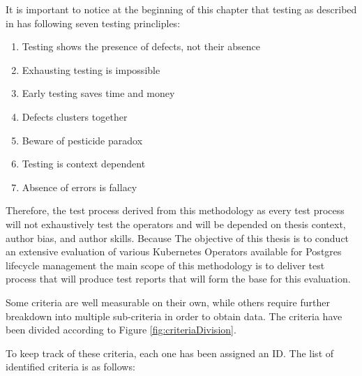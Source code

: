 It is important to notice at the beginning of this chapter that testing as described in \cite{FoundationOfSoftwareTesting} has following seven testing princliples:
\begin{enumerate}
    \item Testing shows the presence of defects, not their absence
    \item Exhausting testing is impossible
    \item Early testing saves time and money
    \item Defects clusters together
    \item Beware of pesticide paradox
    \item Testing is context dependent
    \item Absence of errors is fallacy
\end{enumerate}



Therefore, the test process derived from this methodology as every test process will not exhaustively test the operators and will be depended on thesis context, author bias, and author skills. Because The objective of this thesis is to conduct an extensive evaluation of various Kubernetes
Operators available for Postgres lifecycle management the main scope of this methodology is to deliver test process that will produce test reports that will form the base for this evaluation.

Some criteria are well measurable on their own, while others require further breakdown into multiple sub-criteria in order to obtain data. The criteria have been divided according to Figure \ref{fig:criteriaDivision}.

To keep track of these criteria, each one has been assigned an ID. The list of identified criteria is as follows:

